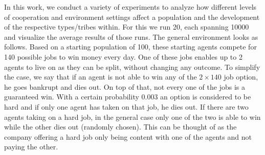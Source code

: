 \documentclass[sigconf]{acmart}
\newcommand{\todo}[1]{{\color{red}{#1}}}
\newcommand{\VNumSimulations}{20\xspace}
\newcommand{\VNumDays}{10000\xspace}
\newcommand{\VNumPop}{100\xspace}
\newcommand{\VNumTrees}{140\xspace}
\newcommand{\VProbPredator}{0.003\xspace}
\begin{document}

    \todo{relate this to related work/experiments}

    In this work, we conduct a variety of experiments to analyze how different levels of cooperation and environment settings affect a population and the development of the respective types/tribes within.
    For this we run \VNumSimulations, each spanning \VNumDays and visualize the average results of those runs.
    The general environment looks as follows.
    Based on a starting population of \VNumPop, these starting agents compete for \VNumTrees possible jobs to win money every day.
    One of these jobs enables up to 2 agents to live on as they can be split, without changing any outcome.
    To simplify the case, we say that if an agent is not able to win any of the $2 \times \VNumTrees$ job option, he goes bankrupt and dies out.
    On top of that, not every one of the jobs is a guaranteed win.
    With a certain probability \VProbPredator an option is considered to be hard and if only one agent has taken on that job, he dies out.
    If there are two agents taking on a hard job, in the general case only one of the two is able to win while the other dies out (randomly chosen).
    This can be thought of as the company offering a hard job only being content with one of the agents and not paying the other.
\end{document}
